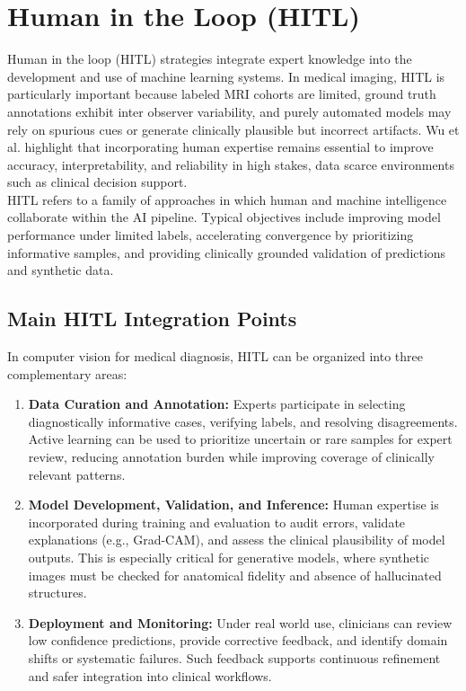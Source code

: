 \section{Human in the Loop (HITL)}

Human in the loop (HITL) strategies integrate expert knowledge into the development and use of machine learning systems. In medical imaging, HITL is particularly important because labeled MRI cohorts are limited, ground truth annotations exhibit inter observer variability, and purely automated models may rely on spurious cues or generate clinically plausible but incorrect artifacts. Wu et al. \cite{wu2022survey} highlight that incorporating human expertise remains essential to improve accuracy, interpretability, and reliability in high stakes, data scarce environments such as clinical decision support.\\

HITL refers to a family of approaches in which human and machine intelligence collaborate within the AI pipeline. Typical objectives include improving model performance under limited labels, accelerating convergence by prioritizing informative samples, and providing clinically grounded validation of predictions and synthetic data.

\subsection{Main HITL Integration Points}

In computer vision for medical diagnosis, HITL can be organized into three complementary areas:

\begin{enumerate}
    \item \textbf{Data Curation and Annotation:} Experts participate in selecting diagnostically informative cases, verifying labels, and resolving disagreements. Active learning can be used to prioritize uncertain or rare samples for expert review, reducing annotation burden while improving coverage of clinically relevant patterns.

    \item \textbf{Model Development, Validation, and Inference:} Human expertise is incorporated during training and evaluation to audit errors, validate explanations (e.g., Grad-CAM), and assess the clinical plausibility of model outputs. This is especially critical for generative models, where synthetic images must be checked for anatomical fidelity and absence of hallucinated structures.

    \item \textbf{Deployment and Monitoring:} Under real world use, clinicians can review low confidence predictions, provide corrective feedback, and identify domain shifts or systematic failures. Such feedback supports continuous refinement and safer integration into clinical workflows.
\end{enumerate}

